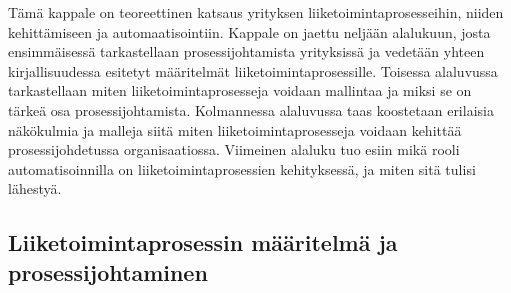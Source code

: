 \documentclass[finnish,12pt,a4paper,pdftex]{article}
\begin{document}


Tämä kappale on teoreettinen katsaus yrityksen liiketoimintaprosesseihin, niiden kehittämiseen ja automaatisointiin. Kappale on jaettu neljään alalukuun, josta ensimmäisessä tarkastellaan prosessijohtamista yrityksissä ja vedetään yhteen kirjallisuudessa esitetyt määritelmät liiketoimintaprosessille. Toisessa alaluvussa tarkastellaan miten liiketoimintaprosesseja voidaan mallintaa ja miksi se on tärkeä osa prosessijohtamista. Kolmannessa alaluvussa taas
koostetaan erilaisia näkökulmia ja malleja siitä miten liiketoimintaprosesseja voidaan kehittää prosessijohdetussa organisaatiossa. Viimeinen alaluku tuo esiin mikä rooli automatisoinnilla on liiketoimintaprosessien kehityksessä, ja miten sitä tulisi lähestyä.




\subsection{Liiketoimintaprosessin määritelmä ja prosessijohtaminen}
\end{document}
